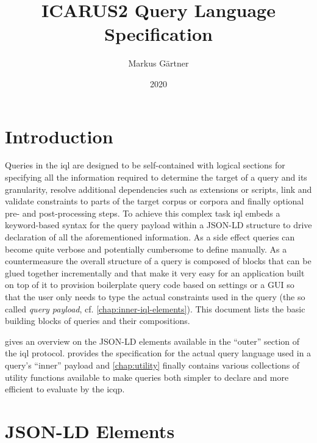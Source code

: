 \documentclass[11pt,a4paper]{report}
\title{ICARUS2 Query Language Specification}
\author{Markus Gärtner}
\date{2020}
\begin{document}
\maketitle

\tableofcontents

\listoffigures

\listoftables

\listoftodos

\newpage

\chapter*{Introduction}
\label{chap:intro}

Queries in the \ac{iql} are designed to be self-contained with logical sections for specifying all the information required to determine the target of a query and its granularity, resolve additional dependencies such as extensions or scripts, link and validate constraints to parts of the target corpus or corpora and finally optional pre- and post-processing steps.
To achieve this complex task \ac{iql} embeds a keyword-based syntax for the query payload within a JSON-LD structure to drive declaration of all the aforementioned information. 
As a side effect queries can become quite verbose and potentially cumbersome to define manually. 
As a countermeasure the overall structure of a query is composed of blocks that can be glued together incrementally and that make it very easy for an application built on top of it to provision boilerplate query code based on settings or a GUI so that the user only needs to type the actual constraints used in the query (the so called \textit{query payload}, cf. \cref{chap:inner-iql-elements}). 
This document lists the basic building blocks of queries and their compositions.

 gives an overview on the JSON-LD elements available in the ``outer'' section of the \ac{iql} protocol.
 provides the specification for the actual query language used in a query's ``inner'' payload and \cref{chap:utility} finally contains various collections of utility functions available to make queries both simpler to declare and more efficient to evaluate by the \ac{icqp}.

\chapter{JSON-LD Elements}
\label{chap:elements}
\end{document}
